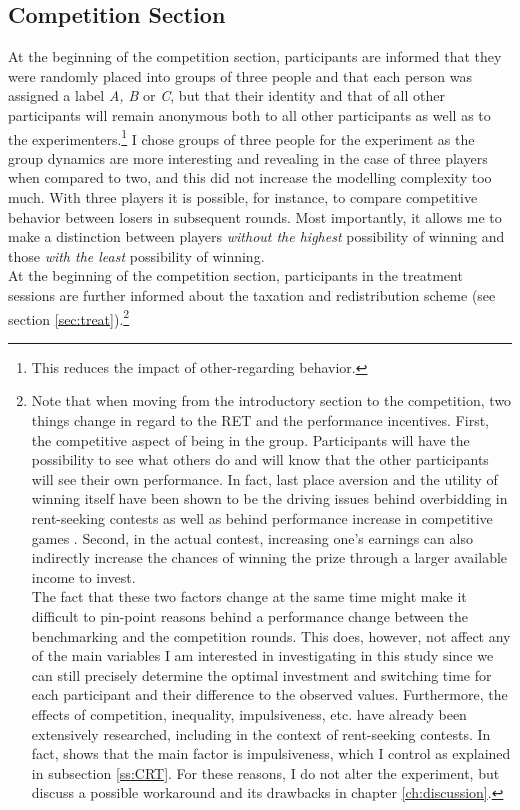     
    \subsection{Competition Section}
    \label{ss:compt}
    
    At the beginning of the competition section, participants are informed that they were randomly placed into groups of three people and that each person was assigned a label \textit{A, B} or \textit{C}, but that their identity and that of all other participants will remain anonymous both to all other participants as well as to the experimenters.\footnote{This reduces the impact of other-regarding behavior.} I chose groups of three people for the experiment as the group dynamics are more interesting and revealing in the case of three players when compared to two, and this did not increase the modelling complexity too much. With three players it is possible, for instance, to compare competitive behavior between losers in subsequent rounds. Most importantly, it allows me to make a distinction between players \textit{without the highest} possibility of winning and those \textit{with the least} possibility of winning.\\
    
    At the beginning of the competition section, participants in the treatment sessions are further informed about the taxation and redistribution scheme (see section \ref{sec:treat}).\footnote{Note that when moving from the introductory section to the competition, two things change in regard to the RET and the performance incentives. First, the competitive aspect of being in the group. Participants will have the possibility to see what others do and will know that the other participants will see their own performance. In fact, last place aversion and the utility of winning itself have been shown to be the driving issues behind overbidding in rent-seeking contests as well as behind performance increase in competitive games \citep{sheremeta2013}. Second, in the actual contest, increasing one's earnings can also indirectly increase the chances of winning the prize through a larger available income to invest.\\
    The fact that these two factors change at the same time might make it difficult to pin-point reasons behind a performance change between the benchmarking and the competition rounds. This does, however, not affect any of the main variables I am interested in investigating in this study since we can still precisely determine the optimal investment and switching time for each participant and their difference to the observed values. Furthermore, the effects of competition, inequality, impulsiveness, etc. have already been extensively researched, including in the context of rent-seeking contests. In fact, \cite{sheremeta2016} shows that the main factor is impulsiveness, which I control as explained in subsection \ref{ss:CRT}. For these reasons, I do not alter the experiment, but discuss a possible workaround and its drawbacks in chapter \ref{ch:discussion}.} 
    
